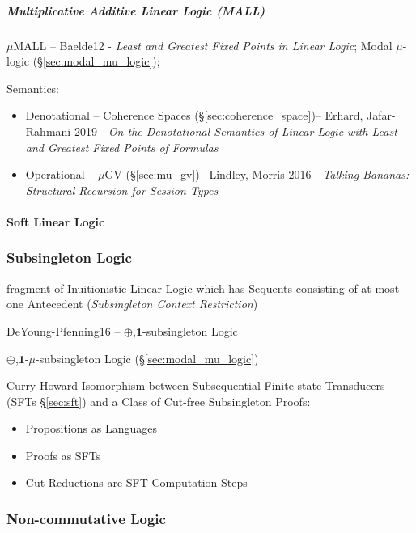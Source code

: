 \subparagraph{Multiplicative Additive Linear Logic (MALL)}\label{sec:mall}\hfill

$\mu$MALL --
Baelde12 - \emph{Least and Greatest Fixed Points in Linear Logic};
\fist Modal $\mu$-logic (\S\ref{sec:modal_mu_logic});

Semantics:
\begin{itemize}
  \item Denotational -- Coherence Spaces (\S\ref{sec:coherence_space})-- Erhard,
    Jafar-Rahmani 2019 - \emph{On the Denotational Semantics of Linear Logic
    with Least and Greatest Fixed Points of Formulas}
  \item Operational -- $\mu$GV (\S\ref{sec:mu_gv})--
    Lindley, Morris 2016 - \emph{Talking Bananas: Structural Recursion for
    Session Types}
\end{itemize}



\paragraph{Soft Linear Logic}\label{sec:soft_linear_logic}\hfill



\subsubsection{Subsingleton Logic}\label{sec:subsingleton_logic}

fragment of Inuitionistic Linear Logic which has Sequents consisting
of at most one Antecedent (\emph{Subsingleton Context Restriction})

DeYoung-Pfenning16 -- $\oplus$,$\mathbf{1}$-subsingleton Logic

\fist $\oplus$,$\mathbf{1}$-$\mu$-subsingleton Logic
(\S\ref{sec:modal_mu_logic})

Curry-Howard Isomorphism between Subsequential Finite-state
Transducers (SFTs \S\ref{sec:sft}) and a Class of Cut-free
Subsingleton Proofs:
\begin{itemize}
  \item Propositions as Languages
  \item Proofs as SFTs
  \item Cut Reductions are SFT Computation Steps
\end{itemize}



\subsubsection{Non-commutative Logic}\label{sec:noncommutative_logic}
\hfill

